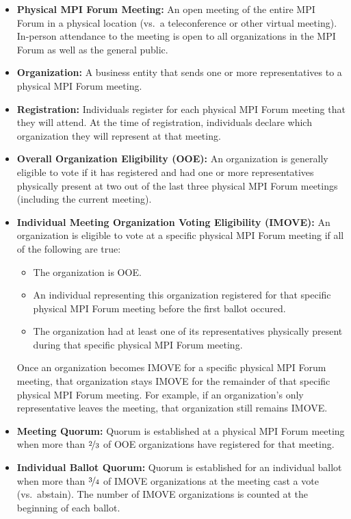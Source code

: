 \begin{itemize}
\item {\bf Physical MPI Forum Meeting:} An open meeting of the entire
  MPI Forum in a physical location (vs.\ a teleconference or other
  virtual meeting).  In-person attendance to the meeting is open to
  all organizations in the MPI Forum as well as the general public.

\item {\bf Organization:} A business entity that sends one or more
  representatives to a physical MPI Forum meeting.

\item {\bf Registration:} Individuals register for each physical MPI
  Forum meeting that they will attend.  At the time of registration,
  individuals declare which organization they will represent at that
  meeting.

\item {\bf Overall Organization Eligibility (OOE):} An organization is
  generally eligible to vote if it has registered and had one or more
  representatives physically present at two out of the last three
  physical MPI Forum meetings (including the current meeting).

\item {\bf Individual Meeting Organization Voting Eligibility
    (IMOVE):} An organization is eligible to vote at a specific
  physical MPI Forum meeting if all of the following are true:
  \begin{itemize}
  \item The organization is OOE.
  \item An individual representing this organization registered for
    that specific physical MPI Forum meeting before the first ballot
    occured.
  \item The organization had at least one of its representatives
    physically present during that specific physical MPI
    Forum meeting.
  \end{itemize}
  Once an organization becomes IMOVE for a specific physical MPI Forum
  meeting, that organization stays IMOVE for the remainder of that
  specific physical MPI Forum meeting.  For example, if an
  organization's only representative leaves the meeting, that
  organization still remains IMOVE.

\item {\bf Meeting Quorum:} Quorum is established at a physical MPI
  Forum meeting when more than $\nicefrac{2}{3}$ of OOE organizations
  have registered for that meeting.

\item {\bf Individual Ballot Quorum:} Quorum is established for an
  individual ballot when more than $\nicefrac{3}{4}$ of IMOVE
  organizations at the meeting cast a vote (vs.\ abstain).  The number
  of IMOVE organizations is counted at the beginning of each ballot.
\end{itemize}
